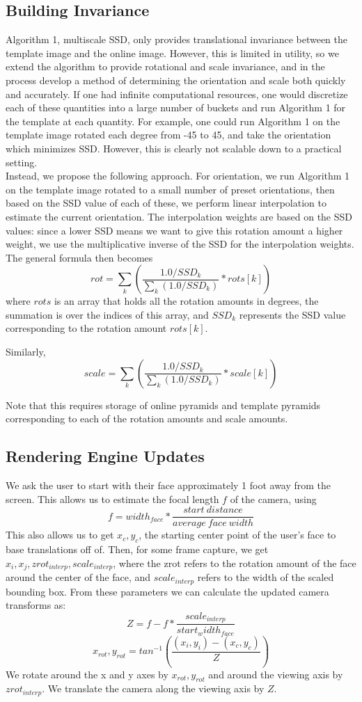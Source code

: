 \documentclass[10pt,twocolumn,letterpaper]{article}
\begin{document}
\subsection*{Building Invariance}
Algorithm 1, multiscale SSD, only provides translational invariance between the
template image and the online image. However, this is limited in utility, so we
extend the algorithm to provide rotational and scale invariance, and in the
process develop a method of determining the orientation and scale both quickly
and accurately. If one had infinite computational resources, one would discretize
each of these quantities into a large number of buckets and run Algorithm 1 for
the template at each quantity. For example, one could run Algorithm 1 on the template
image rotated each degree from -45 to 45, and take the orientation which minimizes SSD.
However, this is clearly not scalable down to a practical setting.\\

Instead, we propose the following approach. For orientation, we run Algorithm 1
on the template image rotated to a small number of preset orientations, then based on the SSD value
of each of these, we perform linear interpolation to estimate the current orientation.
The interpolation weights are based on the SSD values: since a lower SSD means we want
to give this rotation amount a higher weight, we use the multiplicative inverse of the
SSD for the interpolation weights. The general formula then becomes
$$rot = \displaystyle\sum_{k}(\dfrac{1.0 / SSD_{k}}{\sum_{k}(1.0 / SSD_{k})} * rots[k])$$
where $rots$ is an array that holds all the rotation amounts in degrees,
the summation is over the indices of this array, and $SSD_{k}$ represents the SSD value
corresponding to the rotation amount $rots[k]$.

Similarly,
$$scale = \displaystyle\sum_{k}(\dfrac{1.0 / SSD_{k}}{\sum_{k}(1.0 / SSD_{k})} * scale[k])$$

Note that this requires storage of online pyramids and template pyramids corresponding
to each of the rotation amounts and scale amounts.

\subsection*{Rendering Engine Updates}
We ask the user to start with their face approximately 1 foot away from the screen. This allows us to estimate the focal length $f$ of the camera, using 
$$f = width_{face} * \frac{start\ distance}{average\ face\ width}$$
This also allows us to get $x_c,y_c$, the starting center point of the user's face to base translations off of.
Then, for some frame capture, we get $x_i, x_j, zrot_{interp}, scale_{interp}$, where the zrot refers to the rotation amount of the face around the center of the face, and $scale_{interp}$ refers to the width of the scaled bounding box. From these parameters we can calculate the updated camera transforms as:
$$Z = f - f * \frac{scale_{interp}}{start_width_{face}}$$
$$x_{rot}, y_{rot} = tan^{-1}(\frac{(x_i,y_i)-(x_c,y_c)}{Z})$$
We rotate around the x and y axes by $x_{rot}, y_{rot}$ and around the viewing axis by $zrot_{interp}$. We translate the camera along the viewing axis by $Z$.
\end{document}
